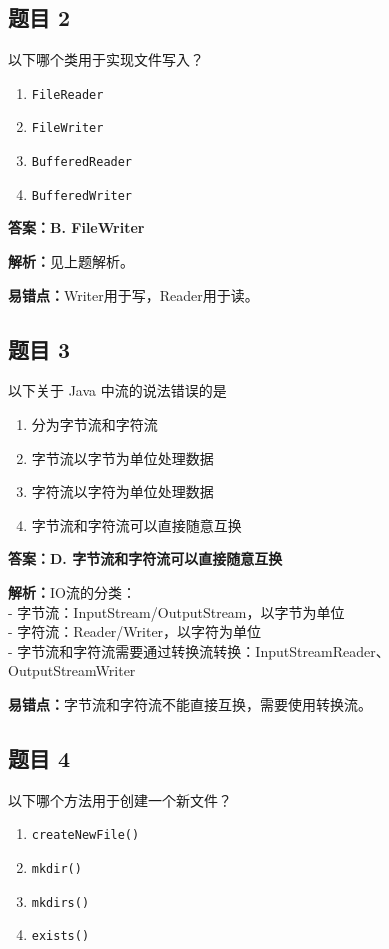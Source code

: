 \documentclass[12pt,a4paper]{ctexart}
\begin{document}
\subsection*{题目 2}
以下哪个类用于实现文件写入？
\begin{enumerate}[label=\Alph*.]
	\item \texttt{FileReader}
	\item \texttt{FileWriter}
	\item \texttt{BufferedReader}
	\item \texttt{BufferedWriter}
\end{enumerate}

\begin{answerbox}
	\textbf{答案：B. FileWriter}

	\textbf{解析：}见上题解析。

	\textbf{易错点：}Writer用于写，Reader用于读。
\end{answerbox}

\subsection*{题目 3}
以下关于 Java 中流的说法错误的是
\begin{enumerate}[label=\Alph*.]
	\item 分为字节流和字符流
	\item 字节流以字节为单位处理数据
	\item 字符流以字符为单位处理数据
	\item 字节流和字符流可以直接随意互换
\end{enumerate}

\begin{answerbox}
	\textbf{答案：D. 字节流和字符流可以直接随意互换}

	\textbf{解析：}IO流的分类：\\
	- 字节流：InputStream/OutputStream，以字节为单位\\
	- 字符流：Reader/Writer，以字符为单位\\
	- 字节流和字符流需要通过转换流转换：InputStreamReader、OutputStreamWriter

	\textbf{易错点：}字节流和字符流不能直接互换，需要使用转换流。
\end{answerbox}

\subsection*{题目 4}
以下哪个方法用于创建一个新文件？
\begin{enumerate}[label=\Alph*.]
	\item \texttt{createNewFile()}
	\item \texttt{mkdir()}
	\item \texttt{mkdirs()}
	\item \texttt{exists()}
\end{enumerate}
\end{document}
